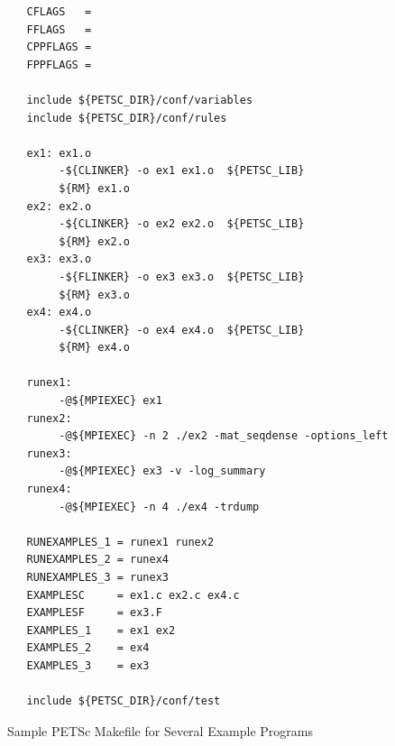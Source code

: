 {{{\begin{figure}[H]
{\small
\begin{verbatim}
   CFLAGS   =
   FFLAGS   =
   CPPFLAGS =
   FPPFLAGS =

   include ${PETSC_DIR}/conf/variables
   include ${PETSC_DIR}/conf/rules

   ex1: ex1.o
        -${CLINKER} -o ex1 ex1.o  ${PETSC_LIB}
        ${RM} ex1.o
   ex2: ex2.o
        -${CLINKER} -o ex2 ex2.o  ${PETSC_LIB}
        ${RM} ex2.o
   ex3: ex3.o
        -${FLINKER} -o ex3 ex3.o  ${PETSC_LIB}
        ${RM} ex3.o
   ex4: ex4.o
        -${CLINKER} -o ex4 ex4.o  ${PETSC_LIB}
        ${RM} ex4.o

   runex1:
        -@${MPIEXEC} ex1
   runex2:
        -@${MPIEXEC} -n 2 ./ex2 -mat_seqdense -options_left
   runex3:
        -@${MPIEXEC} ex3 -v -log_summary
   runex4:
        -@${MPIEXEC} -n 4 ./ex4 -trdump

   RUNEXAMPLES_1 = runex1 runex2
   RUNEXAMPLES_2 = runex4
   RUNEXAMPLES_3 = runex3
   EXAMPLESC     = ex1.c ex2.c ex4.c
   EXAMPLESF     = ex3.F
   EXAMPLES_1    = ex1 ex2
   EXAMPLES_2    = ex4
   EXAMPLES_3    = ex3

   include ${PETSC_DIR}/conf/test
\end{verbatim}
}
\caption{Sample PETSc Makefile for Several Example Programs}
\label{fig_make2}
\end{figure}

}}}
